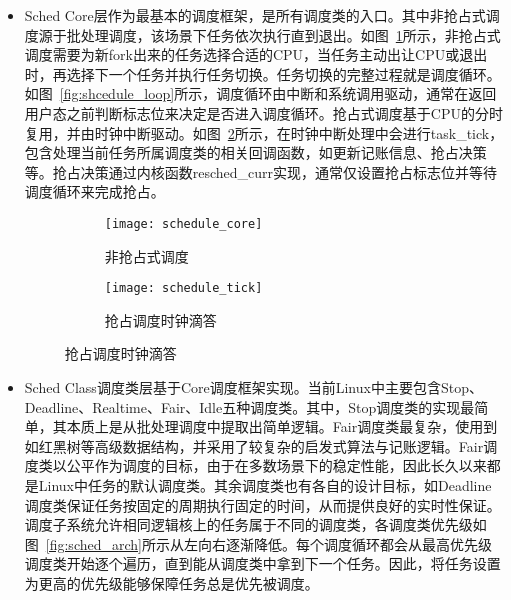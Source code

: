 \begin{itemize}

    \item Sched Core层作为最基本的调度框架，是所有调度类的入口。其中非抢占式调度源于批处理调度，该场景下任务依次执行直到退出。如图~\ref{fig:schedule_core}所示，非抢占式调度需要为新fork出来的任务选择合适的CPU，当任务主动出让CPU或退出时，再选择下一个任务并执行任务切换。任务切换的完整过程就是调度循环。如图~\ref{fig:shcedule_loop}所示，调度循环由中断和系统调用驱动，通常在返回用户态之前判断标志位来决定是否进入调度循环。抢占式调度基于CPU的分时复用，并由时钟中断驱动。如图~\ref{fig:schedule_tick}所示，在时钟中断处理中会进行task\_tick，包含处理当前任务所属调度类的相关回调函数，如更新记账信息、抢占决策等。抢占决策通过内核函数resched\_curr实现，通常仅设置抢占标志位并等待调度循环来完成抢占。

\begin{figure}[!htbp]
    \centering
    \begin{subfigure}[b]{0.42\textwidth}
        \texttt{[image: schedule\_core]}
        \caption{\quad 非抢占式调度}
        \label{fig:schedule_core}
    \end{subfigure}
    \hspace{0.5cm}
    \begin{subfigure}[b]{0.42\textwidth}
        \texttt{[image: schedule\_tick]}
        \caption{\quad 抢占调度时钟滴答}
        \label{fig:schedule_tick}
    \end{subfigure}
    \label{fig:schedule_frame}
\end{figure}

    \item Sched Class调度类层基于Core调度框架实现。当前Linux中主要包含Stop、Deadline、Realtime、Fair、Idle五种调度类\citep{scheduler}。其中，Stop调度类的实现最简单，其本质上是从批处理调度中提取出简单逻辑。Fair调度类最复杂，使用到如红黑树等高级数据结构，并采用了较复杂的启发式算法与记账逻辑。Fair调度类以公平作为调度的目标，由于在多数场景下的稳定性能，因此长久以来都是Linux中任务的默认调度类。其余调度类也有各自的设计目标，如Deadline调度类保证任务按固定的周期执行固定的时间，从而提供良好的实时性保证。调度子系统允许相同逻辑核上的任务属于不同的调度类，各调度类优先级如图~\ref{fig:sched_arch}所示从左向右逐渐降低。每个调度循环都会从最高优先级调度类开始逐个遍历，直到能从调度类中拿到下一个任务。因此，将任务设置为更高的优先级能够保障任务总是优先被调度。


\end{itemize}
